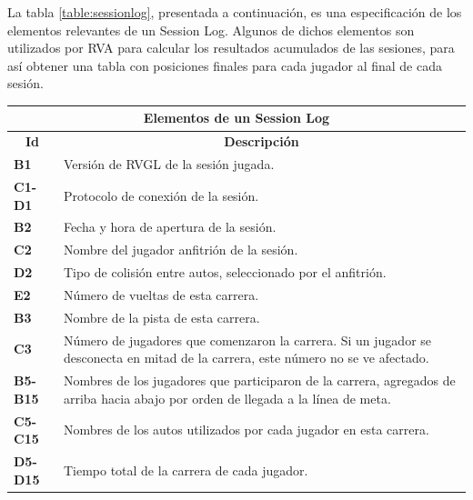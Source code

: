 La tabla \autoref{table:sessionlog}, presentada a continuación, es una especificación de los elementos relevantes de un Session Log. Algunos de dichos elementos son utilizados por RVA para calcular los resultados acumulados de las sesiones, para así obtener una tabla con posiciones finales para cada jugador al final de cada sesión.

\begin{center}
	\begin{tabular}{ | l | p{13cm} |}
		\hline
		\multicolumn{2}{|c|}{\textbf{Elementos de un Session Log}} \\
		\hline
		\multicolumn{1}{|c|}{\textbf{Id}} & \multicolumn{1}{|c|}{\textbf{Descripción}} \\
		\hline
		{\textbf{B1}} & Versión de RVGL de la sesión jugada. \\ \hline
		
		{\textbf{C1-D1}} & Protocolo de conexión de la sesión. \\ \hline
		
		{\textbf{B2}} & Fecha y hora de apertura de la sesión. \\ \hline
		
		{\textbf{C2}} & Nombre del jugador anfitrión de la sesión. \\ \hline
		
		{\textbf{D2}} & Tipo de colisión entre autos, seleccionado por el anfitrión. \\ \hline
		
		{\textbf{E2}} & Número de vueltas de esta carrera. \\ \hline
		
		{\textbf{B3}} & Nombre de la pista de esta carrera. \\ \hline
		
		{\textbf{C3}} & Número de jugadores que comenzaron la carrera. Si un jugador se desconecta en mitad de la carrera, este número no se ve afectado. \\ \hline
		
		{\textbf{B5-B15}} & Nombres de los jugadores que participaron de la carrera, agregados de arriba hacia abajo por orden de llegada a la línea de meta. \\ \hline
		
		{\textbf{C5-C15}} & Nombres de los autos utilizados por cada jugador en esta carrera. \\ \hline
		
		{\textbf{D5-D15}} & Tiempo total de la carrera de cada jugador.\\ \hline
		

\end{tabular}
\end{center}
